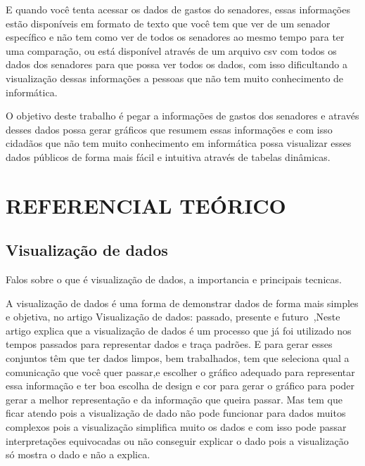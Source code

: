 E quando você tenta acessar os dados de gastos do senadores, essas informações estão disponíveis em formato de texto que você tem que ver de um senador específico e não tem como ver de todos os senadores ao mesmo tempo para ter uma comparação, ou está disponível através de um arquivo csv com todos os dados dos senadores para que possa ver todos os dados, com isso dificultando a visualização dessas informações a pessoas que não tem muito conhecimento de informática.  

O  objetivo deste trabalho é pegar a informações de gastos dos senadores e através desses dados possa gerar gráficos que resumem essas informações e com isso cidadãos que não tem muito conhecimento em informática possa visualizar esses dados públicos de forma mais fácil e intuitiva através de tabelas dinâmicas.




\section{\esp REFERENCIAL TEÓRICO}

 

\subsection{\esp Visualização de dados}

{\color{red} Falos sobre o que é visualização de dados, a importancia e principais tecnicas.}

A visualização de dados é uma forma de demonstrar dados de forma mais simples e objetiva, no artigo Visualização de dados: passado, presente e futuro~\cite{Silva:2019},Neste artigo explica que a visualização de dados é um processo que já foi utilizado nos tempos passados para representar dados e traça padrões. E para gerar esses conjuntos têm que ter dados limpos, bem trabalhados, tem que seleciona qual a comunicação que você quer passar,e escolher o gráfico adequado para representar essa informação e ter boa escolha de design e cor para gerar o gráfico para poder gerar a melhor representação e da informação que queira passar. Mas tem que ficar atendo pois a visualização de dado não pode funcionar para dados muitos complexos pois a visualização simplifica muito os dados e com isso pode passar interpretações equivocadas ou não conseguir explicar o dado pois a visualização só mostra o dado e não a explica.

